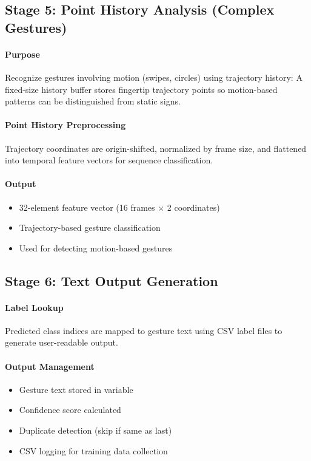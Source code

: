 \subsection{Stage 5: Point History Analysis (Complex Gestures)}

\paragraph{Purpose}

Recognize gestures involving motion (swipes, circles) using trajectory history:
A fixed-size history buffer stores fingertip trajectory points so motion-based patterns can be distinguished from static signs.

\paragraph{Point History Preprocessing}
Trajectory coordinates are origin-shifted, normalized by frame size, and flattened into temporal feature vectors for sequence classification.

\paragraph{Output}
\begin{itemize}
    \item 32-element feature vector (16 frames × 2 coordinates)
    \item Trajectory-based gesture classification
    \item Used for detecting motion-based gestures
\end{itemize}

\subsection{Stage 6: Text Output Generation}

\paragraph{Label Lookup}
Predicted class indices are mapped to gesture text using CSV label files to generate user-readable output.

\paragraph{Output Management}
\begin{itemize}
    \item Gesture text stored in variable
    \item Confidence score calculated
    \item Duplicate detection (skip if same as last)
    \item CSV logging for training data collection
\end{itemize}

